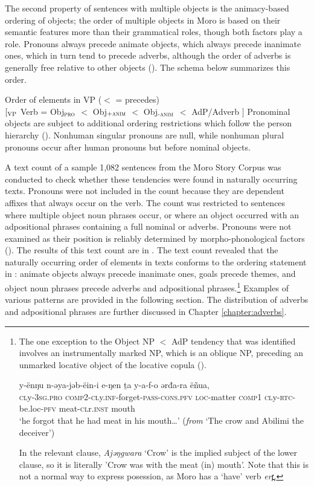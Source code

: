 The second property of sentences with multiple objects is the animacy-based ordering of objects; the order of multiple objects in Moro is based on their semantic features more than their grammatical roles, though both factors play a role. Pronouns always precede animate objects, which always precede inanimate ones,  which in turn tend to precede adverbs, although the order of adverbs is generally free relative to other objects (). The schema below summarizes this order.

\ea Order of elements in VP ($<$ = precedes)\\
$[_{\textsc{VP}}$ Verb = Obj$_{\textsc{pro}}$ $<$ Obj$_{\textsc{+anim}}$ $<$ Obj$_{\textsc{-anim}}$ $<$ AdP/Adverb $]$  \label{ex:ch12:vporder}
\z
Pronominal objects are subject to additional ordering restrictions which follow the person hierarchy (). Nonhuman singular pronouns are null, while nonhuman plural pronouns occur after human pronouns but before nominal objects.

A text count of a sample 1,082 sentences from the Moro Story Corpus was conducted to check whether these tendencies were found in naturally occurring texts. Pronouns were not included in the count because they are dependent affixes that always occur on the verb. The count was restricted to sentences where multiple object noun phrases occur, or where an object occurred with an adpositional phrases containing a full nominal or adverbs. Pronouns were not examined as their position is reliably determined by morpho-phonological factors (). The results of this text count are in . The text count revealed that the naturally occurring order of elements in texts conforms to the ordering statement in : animate objects always precede inanimate ones, goals precede themes, and object noun phrases precede adverbs and adpositional phrases.\footnote{\label{fn:ch12:exception} The one exception to the Object NP $<$ AdP tendency that was identified involves an instrumentally marked NP, which is an oblique NP, preceding an unmarked locative object of the locative copula (). 

\ea \gll y-ënŋu n-ǝya-jǝb-ëin-i e-ŋen ṯa y-a-f-o ǝrđa-ra ëñua,\\
\textsc{cl}y-\textsc{3sg.pro} \textsc{comp2-cl}y.\textsc{inf}-forget\textsc{-pass-cons.pfv} \textsc{loc}-matter \textsc{comp1} \textsc{cl}y-\textsc{rtc}-be.loc-\textsc{pfv} meat-\textsc{cl}r.\textsc{inst} mouth\\
\glt `he forgot that he had meat in his mouth\ldots' (\textit{from} `The crow and Abilimi the deceiver')
\z 

In the relevant clause, \textit{Ajǝŋgwara} `Crow' is the implied subject of the lower clause, so it is literally 'Crow was with the meat (in) mouth'. Note that this is not a normal way to express posession, as Moro has a `have' verb \textit{ert̪}.} Examples of various patterns are provided in the following section. The distribution of adverbs and adpositional phrases are further discussed in Chapter \ref{chapter:adverbs}.

